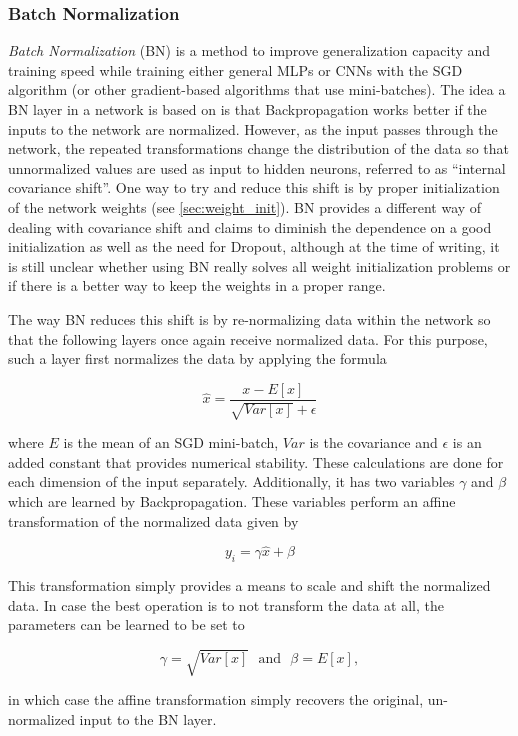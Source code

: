 	\subsubsection {Batch Normalization}
\label{subsec:batchnorm}
\textit{Batch Normalization} (BN) \cite{batchnorm} is a method to improve generalization capacity and training speed while training either general MLPs or CNNs with the SGD algorithm (or other gradient-based algorithms that use mini-batches). The idea a BN layer in a network is based on is that Backpropagation works better if the inputs to the network are normalized. However, as the input passes through the network, the repeated transformations change the distribution of the data so that unnormalized values are used as input to hidden neurons, referred to as ``internal covariance shift''. One way to try and reduce this shift is by proper initialization of the network weights (see \ref{sec:weight_init}). BN provides a different way of dealing with covariance shift and claims to diminish the dependence on a good initialization as well as the need for Dropout, although at the time of writing, it is still unclear whether using BN really solves all weight initialization problems or if there is a better way to keep the weights in a proper range.

The way BN reduces this shift is by re-normalizing data within the network so that the following layers once again receive normalized data. For this purpose, such a layer first normalizes the data by applying the formula 

\[  \hat{x} = \frac{x - E[x]}{\sqrt{Var[x]} + \epsilon} \]

\noindent where $E$ is the mean of an SGD mini-batch, $Var$ is the covariance and $\epsilon$ is an added constant that provides numerical stability. These calculations are done for each dimension of the input separately. Additionally, it has two variables $\gamma$ and $\beta$ which are learned by Backpropagation. These variables perform an affine transformation of the normalized data given by

\[ y_i = \gamma \hat{x} + \beta \]

\noindent This transformation simply provides a means to scale and shift the normalized data. In case the best operation is to not transform the data at all, the parameters can be learned to be set to 

\[ \gamma = \sqrt{Var[x]} \,\,\text{ and } \,\, \beta = E[x] ,\]

\noindent in which case the affine transformation simply recovers the original, un-normalized input to the BN layer.

